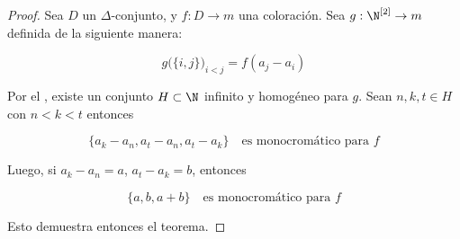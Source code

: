 \begin{proof}
    Sea $D$ un $\Delta$-conjunto, y $f: D \rightarrow m$ una coloración. Sea $g: \N^{[2]} \rightarrow m$ definida de la siguiente manera:
    
    \[
    g \big(\{i,j\}\big)_{i < j} = f(a_j - a_i)
    \]
    
    Por el \TR, existe un conjunto $H \subset \N$ infinito y homogéneo para $g$. Sean $n, k, t \in H$ con $n < k < t$ entonces
    
    \[
    \{a_k - a_n, a_t - a_n, a_t - a_k\} \quad \text{es monocromático para $f$}
    \]
    
    Luego, si $a_k - a_n = a$, $a_t - a_k = b$, entonces
    
    \[
    \{a, b, a+b\} \quad \text{es monocromático para $f$}
    \]
    
    Esto demuestra entonces el teorema.
\end{proof}